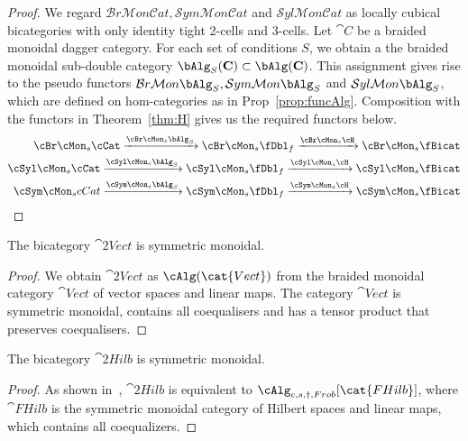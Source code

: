 \begin{proof}
We regard $\mathcal{B}r\mathcal{M}on\mathcal{C}at, 
\mathcal{S}ym\mathcal{M}on\mathcal{C}at$ and $ 
\mathcal{S}yl\mathcal{M}on\mathcal{C}at$ as locally cubical bicategories with only identity tight 2-cells and 3-cells. 
Let ${\cat C}$ be a braided monoidal dagger category. For each set of conditions $S$, we obtain a the braided monoidal sub-double category $\bAlg_S({\bf C}) \subset \bAlg({\bf C})$.  
This assignment gives rise to the pseudo functors $\mathcal{B}r\mathcal{M}on\bAlg_S, 
\mathcal{S}ym\mathcal{M}on\bAlg_S$ and $ 
\mathcal{S}yl\mathcal{M}on\bAlg_S$, which are defined on hom-categories as in Prop~\ref{prop:funcAlg}. Composition with the functors in Theorem~\ref{thm:H} gives us the required functors below.
\begin{align*}
 \cBr\cMon_s\cCat\xrightarrow{\cBr\cMon_s \bAlg_S} \cBr\cMon_s\fDbl_f \xrightarrow{\cBr\cMon_s \cH} \cBr\cMon_s \fBicat \\
   \cSyl\cMon_s\cCat \xrightarrow{\cSyl\cMon_s\bAlg_S} \cSyl\cMon_s\fDbl_f \xrightarrow{\cSyl\cMon_s\cH} \cSyl\cMon_s\fBicat\\
  \cSym\cMon_scCat \xrightarrow{\cSym\cMon_s\bAlg_S} \cSym\cMon_s\fDbl_f \xrightarrow{\cSym\cMon_s \cH} \cSym\cMon_s \fBicat 
\end{align*}
\end{proof}

\begin{cor}
The bicategory $\cat{2Vect}$ is symmetric monoidal.
\end{cor}

\begin{proof}
We obtain $\cat{2Vect}$ as $\cAlg(\cat{Vect})$ from the braided monoidal category $\cat{Vect}$ of vector spaces and linear maps. The category $\cat{Vect}$ is symmetric monoidal, contains all coequalisers and has a tensor product that preserves coequalisers. 
\end{proof}

\begin{cor}
The bicategory $\cat{2Hilb}$ is symmetric monoidal.
\end{cor}

\begin{proof}
As shown in~\cite[Section 3.6.3]{westerthesis}, $\cat{2Hilb}$ is equivalent to $\cAlg_{c,s,\dagger, Frob}[\cat{FHilb}]$, where $\cat{FHilb}$ is the symmetric monoidal category of Hilbert spaces and linear maps, which contains all coequalizers.
\end{proof}


